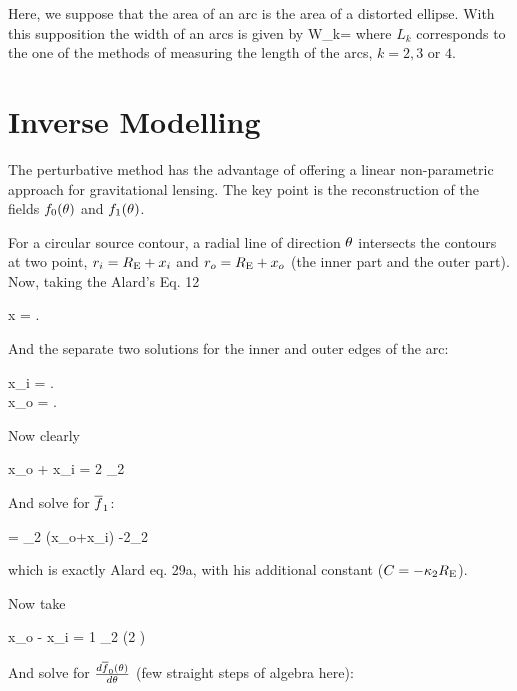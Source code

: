 Here, we suppose that the area of an arc is the area of a distorted ellipse. With this supposition the
width of an arcs is given by
\beq
W_k=
\eeq
where $L_k$ corresponds to the one of the methods of measuring the length of the arcs, $k=2,3$ or
$4$. 


\section{Inverse Modelling}

The perturbative method has the advantage of offering a linear non-parametric
approach for gravitational lensing. The key point is the reconstruction of the
fields $f_0(\theta)$ and $f_1(\theta)$.


For a circular source contour, a radial line of direction $\theta$ intersects
the contours at two point, $r_i=R_{\mathrm{E}}+x_i$ and $r_o=R_{\mathrm{E}}+x_o$ (the inner part and
the outer part). Now, taking the Alard's Eq. 12

\beq
x = . \;\;\;
\eeq

And the separate two solutions for the inner and outer edges of the arc:



\bea
x_i = . \;\;\;  \\
x_o = . \;\;\;
\eea


Now clearly

\beq
x_o + x_i  = {2 \over \kappa_2} \re
\eeq

And solve for $\overline{f}_1$:


\beq
\fbar = {\kappa_2 } (x_o+x_i) -2\kappa_2 \re
\eeq

which is exactly Alard eq. 29a, with his additional constant ($C=-\kappa_2R_{\mathrm{E}}$).

Now take

\beq
x_o - x_i = {1 \over \kappa_2} \left(2 \right)
\eeq

And solve for ${d \overline{f}_0(\theta) \over d \theta}$ (few straight steps of algebra here):

